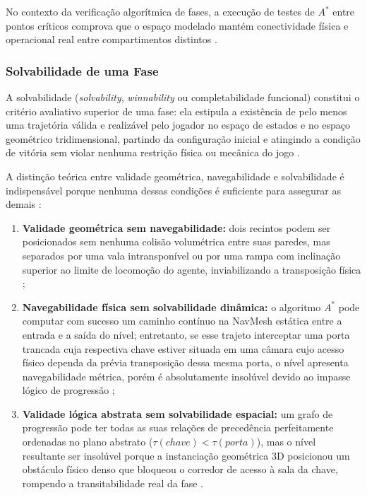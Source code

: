 No contexto da verificação algorítmica de fases, a execução de testes de $A^*$ entre pontos críticos comprova que o espaço modelado mantém conectividade física e operacional real entre compartimentos distintos \cite{sun2024roomplanner, xu2025databasedrivenframework3dlevel}.

\subsubsection{Solvabilidade de uma Fase}
\label{sec:solvabilidade}

A solvabilidade (\textit{solvability}, \textit{winnability} ou completabilidade funcional) constitui o critério avaliativo superior de uma fase: ela estipula a existência de pelo menos uma trajetória válida e realizável pelo jogador no espaço de estados e no espaço geométrico tridimensional, partindo da configuração inicial e atingindo a condição de vitória sem violar nenhuma restrição física ou mecânica do jogo \cite{tanagra, dormans2010, linden2014dungeons, summerville2018procedural, nasir2024word2worldgeneratingstoriesworlds, xu2025constraint}.

A distinção teórica entre validade geométrica, navegabilidade e solvabilidade é indispensável porque nenhuma dessas condições é suficiente para assegurar as demais \cite{dormans2010, linden2014dungeons, summerville2018procedural, xu2025constraint}:
\begin{enumerate}
    \item \textbf{Validade geométrica sem navegabilidade:} dois recintos podem ser posicionados sem nenhuma colisão volumétrica entre suas paredes, mas separados por uma vala intransponível ou por uma rampa com inclinação superior ao limite de locomoção do agente, inviabilizando a transposição física \cite{sun2024roomplanner, xu2025databasedrivenframework3dlevel};
    \item \textbf{Navegabilidade física sem solvabilidade dinâmica:} o algoritmo $A^*$ pode computar com sucesso um caminho contínuo na NavMesh estática entre a entrada e a saída do nível; entretanto, se esse trajeto interceptar uma porta trancada cuja respectiva chave estiver situada em uma câmara cujo acesso físico dependa da prévia transposição dessa mesma porta, o nível apresenta navegabilidade métrica, porém é absolutamente insolúvel devido ao impasse lógico de progressão \cite{dormans2010, linden2013designing, xu2025constraint};
    \item \textbf{Validade lógica abstrata sem solvabilidade espacial:} um grafo de progressão pode ter todas as suas relações de precedência perfeitamente ordenadas no plano abstrato ($\tau(chave) < \tau(porta)$), mas o nível resultante ser insolúvel porque a instanciação geométrica 3D posicionou um obstáculo físico denso que bloqueou o corredor de acesso à sala da chave, rompendo a transitabilidade real da fase \cite{linden2014dungeons, xu2025databasedrivenframework3dlevel}.
\end{enumerate}

